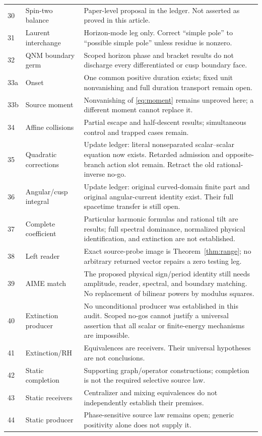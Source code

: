 \begin{longtable}{@{}p{.07\linewidth}p{.28\linewidth}p{.59\linewidth}@{}}
30 & Spin-two balance & Paper-level proposal in the ledger. Not asserted as proved in this article.\\
31 & Laurent interchange & Horizon-mode leg only. Correct ``simple pole'' to ``possible simple pole'' unless residue is nonzero.\\
32 & QNM boundary germ & Scoped horizon phase and bracket results do not discharge every differentiated or cusp boundary face.\\
33a & Onset & One common positive duration exists; fixed unit nonvanishing and full duration transport remain open.\\
33b & Source moment & Nonvanishing of \eqref{eq:moment} remains unproved here; a different moment cannot replace it.\\
34 & Affine collisions & Partial escape and half-descent results; simultaneous control and trapped cases remain.\\
35 & Quadratic corrections & Update ledger: literal nonseparated scalar--scalar equation now exists. Retarded admission and opposite-branch action slot remain. Retract the old rational-inverse no-go.\\
36 & Angular/cusp integral & Update ledger: original curved-domain finite part and original angular-current identity exist. Their full spacetime transfer is still open.\\
37 & Complete coefficient & Particular harmonic formulas and rational tilt are results; full spectral dominance, normalized physical identification, and extinction are not established.\\
38 & Left reader & Exact source-probe image is Theorem~\ref{thm:range}; no arbitrary returned vector repairs a zero testing leg.\\
39 & AIME match & The proposed physical sign/period identity still needs amplitude, reader, spectral, and boundary matching. No replacement of bilinear powers by modulus squares.\\
40 & Extinction producer & No unconditional producer was established in this audit. Scoped no-gos cannot justify a universal assertion that all scalar or finite-energy mechanisms are impossible.\\
41 & Extinction/RH & Equivalences are receivers. Their universal hypotheses are not conclusions.\\
42 & Static completion & Supporting graph/operator constructions; completion is not the required selective source law.\\
43 & Static receivers & Centralizer and mixing equivalences do not independently establish their premises.\\
44 & Static producer & Phase-sensitive source law remains open; generic positivity alone does not supply it.\\
\end{longtable}
\normalsize

